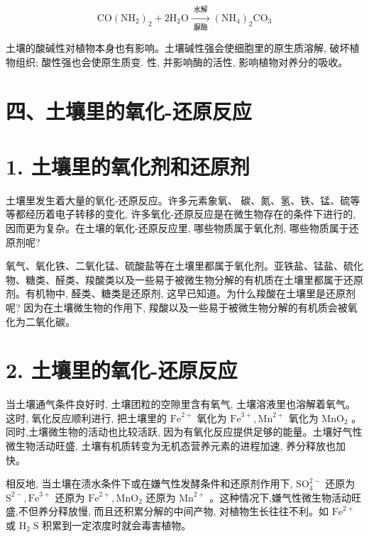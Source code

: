 \documentclass[10pt]{article}
\begin{document}
\[
\mathrm{{CO}}{\left( {\mathrm{{NH}}}_{2}\right) }_{2} + 2{\mathrm{H}}_{2}\mathrm{O}\xrightarrow[\text{ 脲酶 }]{\text{ 水解 }}{\left( {\mathrm{{NH}}}_{4}\right) }_{2}{\mathrm{{CO}}}_{3}
\]

土壤的酸碱性对植物本身也有影响。土壤碱性强会使细胞里的原生质溶解, 破坏植物组织; 酸性强也会使原生质变. 性, 并影响酶的活性, 影响植物对养分的吸收。

\section*{四、土壤里的氧化-还原反应}

\section*{1. 土壤里的氧化剂和还原剂}

土壤里发生着大量的氧化-还原反应。许多元素象氧、 碳、氮、氢、铁、锰、硫等等都经历着电子转移的变化, 许多氧化-还原反应是在微生物存在的条件下进行的, 因而更为复杂。在土壤的氧化-还原反应里, 哪些物质属于氧化剂, 哪些物质属于还原剂呢?

氧气、氧化铁、二氧化锰、硫酸盐等在土壤里都属于氧化剂。亚铁盐、锰盐、硫化物、糖类、醛类、羧酸类以及一些易于被微生物分解的有机质在土壤里都属于还原剂。有机物中, 醛类、糖类是还原剂, 这早已知道。为什么羧酸在土壤里是还原剂呢? 因为在土壤微生物的作用下, 羧酸以及一些易于被微生物分解的有机质会被氧化为二氧化碳。

\section*{2. 土壤里的氧化-还原反应}

当土壤通气条件良好时, 土壤团粒的空隙里含有氧气, 土壤溶液里也溶解着氧气。这时, 氧化反应顺利进行, 把土壤里的 \({\mathrm{{Fe}}}^{2 + }\) 氧化为 \({\mathrm{{Fe}}}^{3 + },{\mathrm{{Mn}}}^{2 + }\) 氧化为 \({\mathrm{{MnO}}}_{2}\) 。同时,土壤微生物的活动也比较活跃, 因为有氧化反应提供足够的能量。土壤好气性微生物活动旺盛, 土壤有机质转变为无机态营养元素的进程加速, 养分释放也加快。

相反地, 当土壤在渍水条件下或在嫌气性发酵条件和还原剂作用下, \({\mathrm{{SO}}}_{4}^{2 - }\) 还原为 \({\mathrm{S}}^{2 - },{\mathrm{{Fe}}}^{3 + }\) 还原为 \({\mathrm{{Fe}}}^{2 + },{\mathrm{{MnO}}}_{2}\) 还原为 \({\mathrm{{Mn}}}^{2 + }\) 。这种情况下,嫌气性微生物活动旺盛,不但养分释放慢, 而且还积累分解的中间产物, 对植物生长往往不利。如 \({\mathrm{{Fe}}}^{2 + }\) 或 \({\mathrm{H}}_{2}\mathrm{\;S}\) 积累到一定浓度时就会毒害植物。
\end{document}
